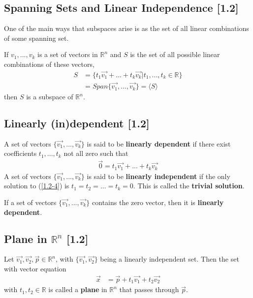 \documentclass[a4paper,9pt]{extarticle}
\begin{document}
\begin{multicols*}{2}

\subsection{Spanning Sets and Linear Independence [1.2]}
One of the main ways that subspaces arise is as the set of all linear combinations of some spanning set.

If ${v_1, ..., v_k}$ is a set of vectors in $\mathbb{R}^n$ and $S$ is the set of all possible linear combinations of these vectors,
\begin{equation} \label{1.2-3}
    \begin{split}
        S & = \{t_1 \vec{v_1} + ... + t_k \vec{v_k} | t_1, ..., t_k \in \mathbb{R}\} \\ & = Span\{\vec{v_1}, ..., \vec{v_k}\} = \langle S \rangle
    \end{split}
\end{equation}
then $S$ is a subspace of $\mathbb{R}^n$.


\subsection{Linearly (in)dependent [1.2]}
A set of vectors $\{\vec{v_1}, ..., \vec{v_k}\}$ is said to be \textbf{linearly dependent} if there exist coefficients $t_1, ..., t_k$ not all zero such that
\begin{equation} \label{1.2-4}
    \begin{split}
        \vec{0} = t_1 \vec{v_1} + ... + t_k \vec{v_k}
    \end{split}
\end{equation}
A set of vectors $\{\vec{v_1}, ..., \vec{v_k}\}$ is said to be \textbf{linearly independent} if the only solution to (\ref{1.2-4}) is $t_1 = t_2 = ... = t_k = 0$. This is called the \textbf{trivial solution}.

If a set of vectors $\{\vec{v_1}, ..., \vec{v_k}\}$ contains the zero vector, then it is \textbf{linearly dependent}.


\subsection{Plane in $\mathbb{R}^n$ [1.2]}
Let $\vec{v_1}, \vec{v_2}, \vec{p} \in \mathbb{R}^n$, with $\{\vec{v_1}, \vec{v_2}\}$ being a linearly independent set. Then the set with vector equation
\begin{equation} \label{1.2-5}
    \begin{split}
        \vec{x} & = \vec{p} + t_1 \vec{v_1} + t_2 \vec{v_2}
    \end{split}
\end{equation}
with $t_1,t_2 \in \mathbb{R}$ is called a \textbf{plane} in $\mathbb{R}^n$ that passes through $\vec{p}$.


\end{multicols*}
\end{document}
